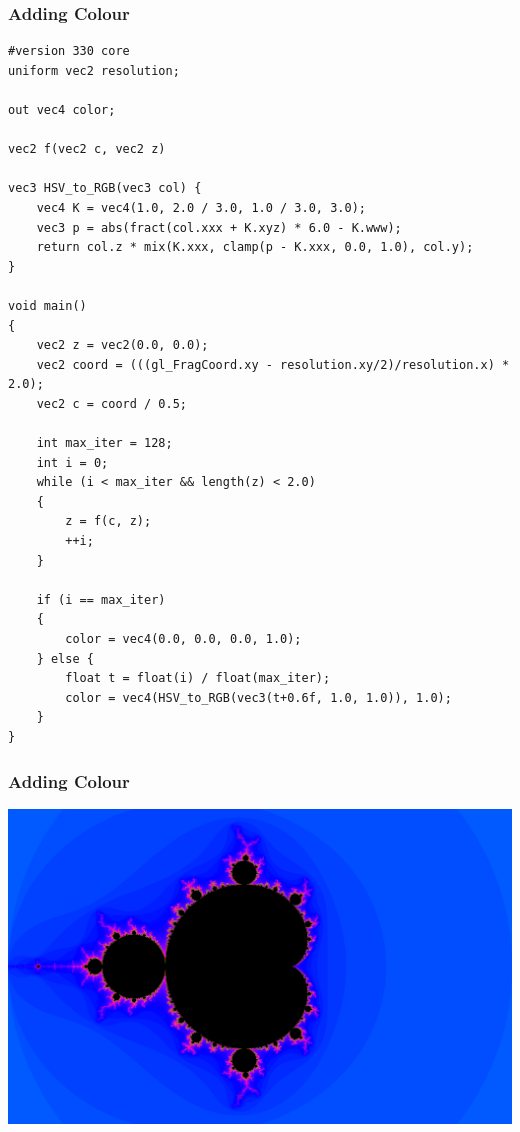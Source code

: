 \documentclass{beamer}
\begin{document}
\begin{frame}[fragile]
\frametitle{Adding Colour}

\begin{verbatim}
#version 330 core
uniform vec2 resolution;

out vec4 color;

vec2 f(vec2 c, vec2 z)

vec3 HSV_to_RGB(vec3 col) {
    vec4 K = vec4(1.0, 2.0 / 3.0, 1.0 / 3.0, 3.0);
    vec3 p = abs(fract(col.xxx + K.xyz) * 6.0 - K.www);
    return col.z * mix(K.xxx, clamp(p - K.xxx, 0.0, 1.0), col.y);
}

void main()
{
    vec2 z = vec2(0.0, 0.0);
    vec2 coord = (((gl_FragCoord.xy - resolution.xy/2)/resolution.x) * 2.0);
    vec2 c = coord / 0.5;

    int max_iter = 128;
    int i = 0;
    while (i < max_iter && length(z) < 2.0)
    {
        z = f(c, z);
        ++i;
    }

    if (i == max_iter)
    {
        color = vec4(0.0, 0.0, 0.0, 1.0);
    } else {
        float t = float(i) / float(max_iter);
        color = vec4(HSV_to_RGB(vec3(t+0.6f, 1.0, 1.0)), 1.0);
    }
}

\end{verbatim}
\end{frame}


\begin{frame}
\frametitle{Adding Colour}
\includegraphics[width=1.0\textwidth]{ColourMandelbrot.png}
\end{frame}
\end{document}
